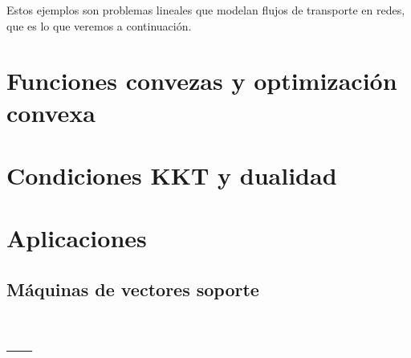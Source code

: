 \documentclass[palatino,nochap]{apuntes}
\begin{document}
Estos ejemplos son problemas lineales que modelan flujos de transporte en redes, que es lo que veremos a continuación.



\chapter{Funciones convezas y optimización convexa}

\chapter{Condiciones KKT y dualidad}

\chapter{Aplicaciones}
\section{Máquinas de vectores soporte}

\appendix

\chapter{---}

\printindex
\end{document}

